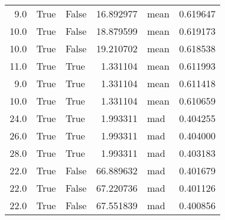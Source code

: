 \begin{table}[htp]
\begin{tabular}{rllrlr}
         9.0 &           True &       False &  16.892977 &        mean &  0.619647 \\
        10.0 &           True &       False &  18.879599 &        mean &  0.619173 \\
        10.0 &           True &       False &  19.210702 &        mean &  0.618538 \\
        11.0 &           True &        True &   1.331104 &        mean &  0.611993 \\
         9.0 &           True &        True &   1.331104 &        mean &  0.611418 \\
        10.0 &           True &        True &   1.331104 &        mean &  0.610659 \\
        24.0 &           True &        True &   1.993311 &         mad &  0.404255 \\
        26.0 &           True &        True &   1.993311 &         mad &  0.404000 \\
        28.0 &           True &        True &   1.993311 &         mad &  0.403183 \\
        22.0 &           True &       False &  66.889632 &         mad &  0.401679 \\
        22.0 &           True &       False &  67.220736 &         mad &  0.401126 \\
        22.0 &           True &       False &  67.551839 &         mad &  0.400856 \\
\bottomrule
\end{tabular}
\end{table}
